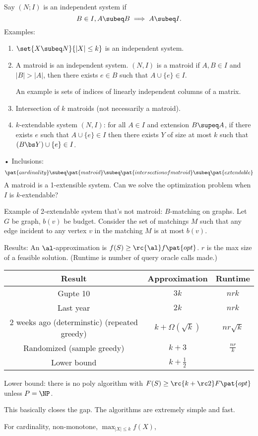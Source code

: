 Say $(N;I)$ is an independent system  if
$$
B\in I, A\subeq B\implies A\subeq I.
$$
Examples: 
\begin{enumerate}
\item
$\set{X\subeq N}{|X|\le k}$
is an independent system.
\item
A matroid is an independent system. 
$(N,I)$ is a matroid if  $A,B\in I$ and $|B|>|A|$, then there exists $e\in B$ such that $A\cup \{e\}\in I$.

An example is sets of indices of linearly independent columns of a matrix.
\item
Intersection of $k$ matroids (not necessarily a matroid).
\item
$k$-extendable system $(N,I)$: for all $A\in I$ and  extension $B\supeq A$, %
if there exists $e$ such that $A\cup \{e\}\in I$ then there exists $Y$ of size at most $k$ such that $(B\bs Y) \cup \{e\}\in I$.
\end{enumerate}•
Inclusions:
$$
\pat{cardinality}\subeq \pat{matroid}\subeq \pat{intersection of matroid} \subeq \pat{extendable}
$$
A matroid is a 1-extensible system.
Can we solve the optimization problem when $I$ is $k$-extendable? 


Example of 2-extendable system that's not matroid: $B$-matching on graphs. Let $G$ be graph, $b(v)$ be budget. Consider the set of matchings $M$ such that any edge incident to any vertex $v$ in the matching $M$ is at most $b(v)$.

Results: An $\al$-approximation is $f(S)\ge \rc{\al}f\pat{opt}$. $r$ is the max size of a feasible solution.
(Runtime is number of query oracle calls made.)

\begin{tabular}{|c|c|c|}
\hline 
Result & Approximation & Runtime\tabularnewline
\hline 
Gupte 10 & $3k$ & $nrk$\tabularnewline
\hline 
Last year & $2k$ & $nrk$\tabularnewline
\hline 
2 weeks ago (determinstic) (repeated greedy) & $k+\Omega(\sqrt{k})$ & $nr\sqrt{k}$\tabularnewline
\hline 
Randomized (sample greedy) & $k+3$ & $\frac{nr}{k}$\tabularnewline
\hline 
Lower bound & $k+\frac{1}{2}$ & \tabularnewline
\hline 
\end{tabular}


Lower bound: there is no poly algorithm with $F(S) \ge \rc{k+\rc 2} F\pat{opt}$ unless $P=\NP$.

This basically closes the gap. The algorithms are extremely simple and fast.

For cardinality, non-monotone,  $\max_{|X|\le k} f(X)$,

